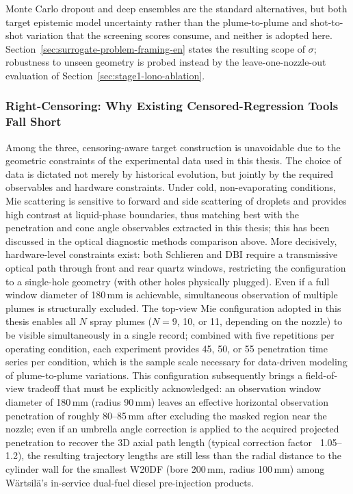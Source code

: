 Monte Carlo dropout \cite{GalGhahramani2016Dropout} and deep ensembles \cite{LakshminarayananEnsembles2017} are the standard alternatives, but both target epistemic model uncertainty rather than the plume-to-plume and shot-to-shot variation that the screening scores consume, and neither is adopted here. Section~\ref{sec:surrogate-problem-framing-en} states the resulting scope of \(\sigma\); robustness to unseen geometry is probed instead by the leave-one-nozzle-out evaluation of Section~\ref{sec:stage1-lono-ablation}.

\subsubsection{Right-Censoring: Why Existing Censored-Regression Tools Fall Short}

Among the three, censoring-aware target construction is unavoidable due to the geometric constraints of the experimental data used in this thesis.
The choice of data is dictated not merely by historical evolution, but jointly by the required observables and hardware constraints.
Under cold, non-evaporating conditions, Mie scattering is sensitive to forward and side scattering of droplets and provides high contrast at liquid-phase boundaries, thus matching best with the penetration and cone angle observables extracted in this thesis; this has been discussed in the optical diagnostic methods comparison above.
More decisively, hardware-level constraints exist: both Schlieren and DBI require a transmissive optical path through front and rear quartz windows, restricting the configuration to a single-hole geometry (with other holes physically plugged). Even if a full window diameter of 180\,mm is achievable, simultaneous observation of multiple plumes is structurally excluded.
The top-view Mie configuration adopted in this thesis enables all $N$ spray plumes ($N=9$, 10, or 11, depending on the nozzle) to be visible simultaneously in a single record;
combined with five repetitions per operating condition, each experiment provides 45, 50, or 55 penetration time series per condition, which is the sample scale necessary for data-driven modeling of plume-to-plume variations.
This configuration subsequently brings a field-of-view tradeoff that must be explicitly acknowledged: an observation window diameter of 180\,mm (radius 90\,mm) leaves an effective horizontal observation penetration of roughly 80--85\,mm after excluding the masked region near the nozzle;
even if an umbrella angle correction is applied to the acquired projected penetration to recover the 3D axial path length (typical correction factor ~1.05--1.2), the resulting trajectory lengths are still less than the radial distance to the cylinder wall for the smallest W20DF (bore 200\,mm, radius 100\,mm) among Wärtsilä's in-service dual-fuel diesel pre-injection products.
